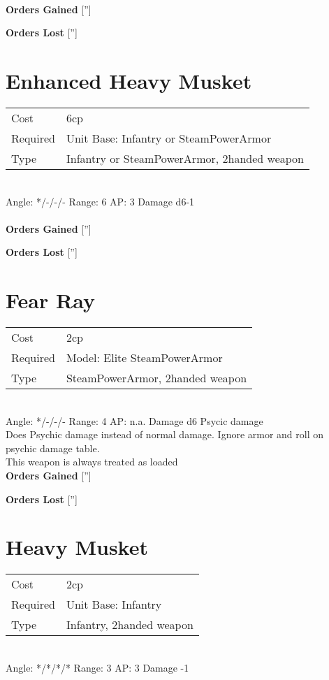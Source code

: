 \ \\

{\bf Orders Gained}
['']

{\bf Orders Lost}
['']
\section{ Enhanced Heavy Musket }

\begin{tabular}{ll}
    Cost & 6cp \\
    Required & Unit Base: Infantry or SteamPowerArmor\\
    Type & Infantry or SteamPowerArmor, 2handed weapon\\
\end{tabular}
\ \\
\indent Angle: */-/-/- Range: 6  AP: 3 Damage d6-1 \\

\ \\

{\bf Orders Gained}
['']

{\bf Orders Lost}
['']
\section{ Fear Ray }

\begin{tabular}{ll}
    Cost & 2cp \\
    Required & Model: Elite SteamPowerArmor\\
    Type & SteamPowerArmor, 2handed weapon\\
\end{tabular}
\ \\
\indent Angle: */-/-/- Range: 4  AP: n.a. Damage d6 Psycic damage \\
Does Psychic damage instead of normal damage. Ignore armor and roll on psychic damage table. \\ This weapon is always treated as loaded
\ \\

{\bf Orders Gained}
['']

{\bf Orders Lost}
['']
\section{ Heavy Musket }

\begin{tabular}{ll}
    Cost & 2cp \\
    Required & Unit Base: Infantry\\
    Type & Infantry, 2handed weapon\\
\end{tabular}
\ \\
\indent Angle: */*/*/* Range: 3  AP: 3 Damage -1 \\


